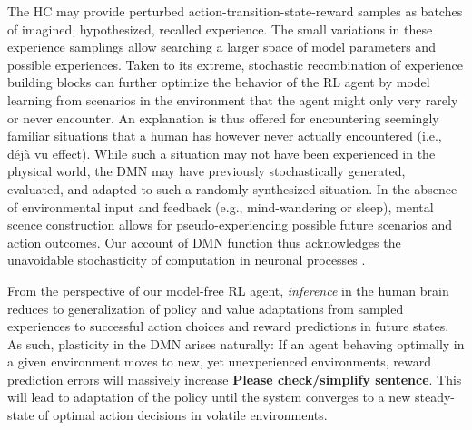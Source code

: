 \documentclass[10pt,letterpaper]{article}
\begin{document}
The HC may provide perturbed action-transition-state-reward samples
  as batches of imagined, hypothesized, recalled experience.
  The small variations in these experience samplings allow searching
  a larger space of model parameters and possible experiences.
  Taken to its extreme, stochastic recombination of experience
  building blocks can further optimize the behavior of the RL agent
  by model learning from scenarios in the environment that the agent might
  only very rarely or never encounter.
  An explanation is thus offered for encountering seemingly familiar situations that
  a human has however never actually encountered (i.e., d\'{e}j\`{a} vu effect).
  While such a situation may not have been experienced in the physical world,
  the DMN may have previously stochastically generated, evaluated, and adapted to
  such a randomly synthesized situation.
  In the absence of environmental input and feedback
  (e.g., mind-wandering or sleep),
  mental scence construction allows for pseudo-experiencing possible
  future scenarios and action outcomes.
  Our account of DMN function thus acknowledges the unavoidable stochasticity of
  computation in neuronal processes \citep{faisal2008noise}.


  From the perspective of our model-free RL agent,
  \textit{inference} in the human brain reduces to
  generalization of
  policy and value adaptations from sampled experiences to
  successful action choices and reward predictions in future states.
  As such,
  plasticity in the DMN arises naturally:
  If an agent behaving optimally in a given environment moves
  to new, yet unexperienced environments, reward prediction errors will
  massively increase \textbf{Please check/simplify sentence}.
  This will lead to adaptation of the policy until the system converges to a
  new steady-state of optimal action decisions in volatile environments.

\end{document}
